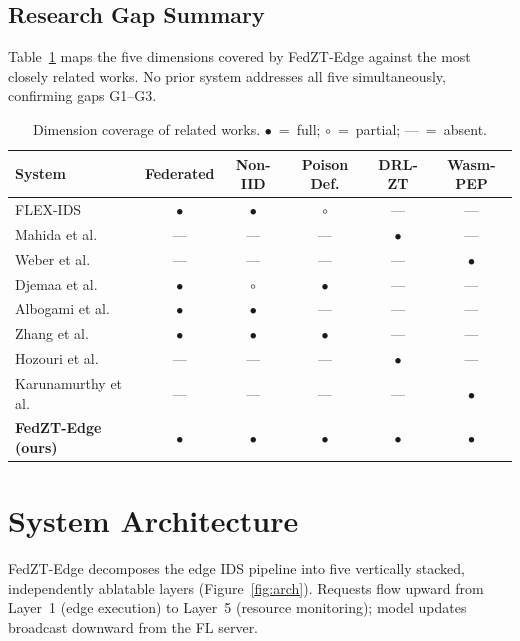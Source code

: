 \documentclass[sn-mathphys,Numbered]{sn-jnl}
\begin{document}
\subsection{Research Gap Summary}
Table~\ref{tab:related} maps the five dimensions covered by FedZT-Edge against the most closely related works. No prior system addresses all five simultaneously, confirming gaps G1--G3.

\begin{table}[htbp]
\caption{Dimension coverage of related works. $\bullet$~=~full; $\circ$~=~partial; ---~=~absent.}\label{tab:related}
\centering\small
\begin{tabular}{@{}lccccc@{}}
\toprule
\textbf{System} & \textbf{Federated} & \textbf{Non-IID} & \textbf{Poison Def.} & \textbf{DRL-ZT} & \textbf{Wasm-PEP} \\
\midrule
FLEX-IDS~\cite{flexids}         & $\bullet$ & $\bullet$ & $\circ$ & --- & --- \\
Mahida et al.~\cite{mahida2026} & --- & --- & --- & $\bullet$ & --- \\
Weber et al.~\cite{weber2026}   & --- & --- & --- & --- & $\bullet$ \\
Djemaa et al.~\cite{djemaa2026} & $\bullet$ & $\circ$ & $\bullet$ & --- & --- \\
Albogami et al.~\cite{albogami2025} & $\bullet$ & $\bullet$ & --- & --- & --- \\
Zhang et al.~\cite{zhang2025}   & $\bullet$ & $\bullet$ & $\bullet$ & --- & --- \\
Hozouri et al.~\cite{hozouri2025} & --- & --- & --- & $\bullet$ & --- \\
Karunamurthy et al.~\cite{karunamurthy2025} & --- & --- & --- & --- & $\bullet$ \\
\midrule
\textbf{FedZT-Edge (ours)} & $\bullet$ & $\bullet$ & $\bullet$ & $\bullet$ & $\bullet$ \\
\bottomrule
\end{tabular}
\end{table}

\section{System Architecture}\label{sec:architecture}

FedZT-Edge decomposes the edge IDS pipeline into five vertically stacked, independently ablatable layers (Figure~\ref{fig:arch}). Requests flow upward from Layer~1 (edge execution) to Layer~5 (resource monitoring); model updates broadcast downward from the FL server.
\end{document}

